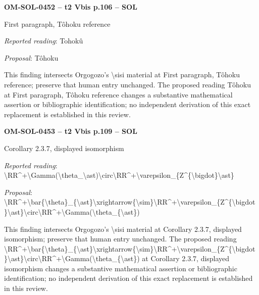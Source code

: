\par\noindent\textbf{OM-SOL-0452 -- t2 Vbis p.106 -- SOL}\par
First paragraph, Tôhoku reference\par
\emph{Reported reading}: Tohokû\par
\emph{Proposal}: Tôhoku\par
This finding intersects Orgogozo's \textbackslash{}sisi material at First paragraph, Tôhoku reference; preserve that human entry unchanged. The proposed reading Tôhoku at First paragraph, Tôhoku reference changes a substantive mathematical assertion or bibliographic identification; no independent derivation of this exact replacement is established in this review.\par
\par\noindent\textbf{OM-SOL-0453 -- t2 Vbis p.109 -- SOL}\par
Corollary 2.3.7, displayed isomorphism\par
\emph{Reported reading}: \textbackslash{}RR\textasciicircum{}+\textbackslash{}Gamma(\textbackslash{}theta\_\textbackslash{}ast)\textbackslash{}circ\textbackslash{}RR\textasciicircum{}+\textbackslash{}varepsilon\_\{Z\textasciicircum{}\{\textbackslash{}bigdot\}\textbackslash{}ast\}\par
\emph{Proposal}: \textbackslash{}RR\textasciicircum{}+\textbackslash{}bar\{\textbackslash{}theta\}\_\{\textbackslash{}ast\}\textbackslash{}xrightarrow\{\textbackslash{}sim\}\textbackslash{}RR\textasciicircum{}+\textbackslash{}varepsilon\_\{Z\textasciicircum{}\{\textbackslash{}bigdot\}\textbackslash{}ast\}\textbackslash{}circ\textbackslash{}RR\textasciicircum{}+\textbackslash{}Gamma(\textbackslash{}theta\_\{\textbackslash{}ast\})\par
This finding intersects Orgogozo's \textbackslash{}sisi material at Corollary 2.3.7, displayed isomorphism; preserve that human entry unchanged. The proposed reading \textbackslash{}RR\textasciicircum{}+\textbackslash{}bar\{\textbackslash{}theta\}\_\{\textbackslash{}ast\}\textbackslash{}xrightarrow\{\textbackslash{}sim\}\textbackslash{}RR\textasciicircum{}+\textbackslash{}varepsilon\_\{Z\textasciicircum{}\{\textbackslash{}bigdot\}\textbackslash{}ast\}\textbackslash{}circ\textbackslash{}RR\textasciicircum{}+\textbackslash{}Gamma(\textbackslash{}theta\_\{\textbackslash{}ast\}) at Corollary 2.3.7, displayed isomorphism changes a substantive mathematical assertion or bibliographic identification; no independent derivation of this exact replacement is established in this review.\par

